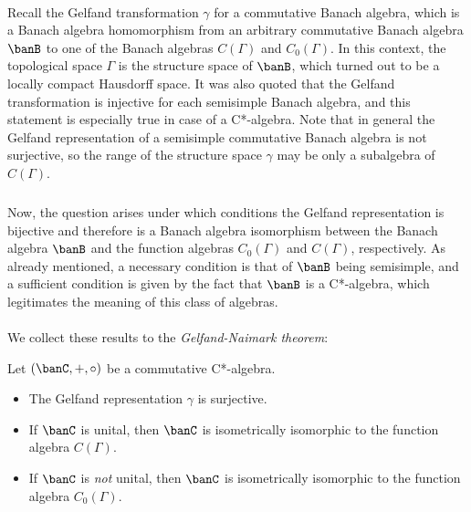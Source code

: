 \documentclass[11pt,twoside]{article}
\begin{document}
\paragraph{} %
Recall the Gelfand transformation $\gamma$ for a commutative Banach algebra,
which is a Banach algebra homomorphism from an arbitrary commutative
Banach algebra $\banB$ to one of the Banach algebras $C(\Gamma)$
and $C_0(\Gamma)$.
In this context, the topological space $\Gamma$
is the structure space of $\banB$,
which turned out to be a locally compact Hausdorff space.
It was also quoted
that the Gelfand transformation is injective for each semisimple Banach algebra,
and this statement is especially true in case of a C*-algebra.
Note
that in general the Gelfand representation
of a semisimple commutative Banach algebra is not surjective,
so the range of the structure space $\gamma$ may be
only a subalgebra of $C(\Gamma)$.

\subparagraph{}
Now,
the question arises
under which conditions the Gelfand representation is bijective
and therefore is a Banach algebra isomorphism
between the Banach algebra $\banB$ and the function algebras 
$C_0(\Gamma)$ and $C(\Gamma)$, respectively.
As already mentioned,
a necessary condition is that of $\banB$ being semisimple,
and a sufficient condition is given by the fact
that $\banB$ is a C*-algebra,
which legitimates the meaning of this class of algebras.

\paragraph{} %
We collect these results to the \textit{Gelfand-Naimark theorem}:

\begin{theorem1}\label{GELFAND_NAIMARK_THEOREM}
Let $(\banC,+,\circ)$ be a commutative C*-algebra.

\begin{itemize}[leftmargin=15pt]
\item[(a)]
The Gelfand representation $\gamma$ is surjective.

\item[(b)]
If $\banC$ is unital,
then $\banC$ is isometrically isomorphic to the function algebra $C(\Gamma)$.

\item[(c)]
If $\banC$ is \textit{not} unital,
then $\banC$ is isometrically isomorphic to the function algebra $C_0(\Gamma)$.
\end{itemize}
\end{theorem1}
\end{document}
